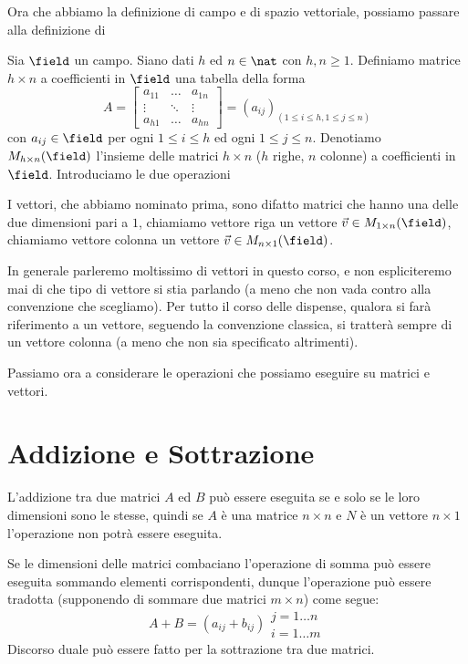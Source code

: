 Ora che abbiamo la definizione di campo e di spazio vettoriale, possiamo passare alla definizione di
\begin{definition} [Matrice]
	Sia $\field$ un campo. Siano dati $h$ ed $n \in \nat$ con $h, n \geq 1$. Definiamo matrice $h \times n$ a coefficienti in $\field$ una tabella della forma
	\begin{equation}
		A =
		\begin{bmatrix}
			a_{11} & \dots  & a_{1n} \\
			\vdots & \ddots & \vdots \\
			a_{h1} & \dots  & a_{hn}
		\end{bmatrix}
		= (a_{ij})_{(1 \leq i \leq h, 1 \leq j \leq n)}
	\end{equation}
	con $a_{ij} \in \field$ per ogni $1 \leq i \leq h$ ed ogni $1 \leq j \leq n$. Denotiamo $M_{h \times n}(\field)$ l'insieme delle matrici $h \times n$ ($h$ righe, $n$ colonne) a coefficienti in $\field$. Introduciamo le due operazioni
\end{definition}
I vettori, che abbiamo nominato prima, sono difatto matrici che hanno una delle due dimensioni pari a $1$, chiamiamo vettore riga un vettore $\vec{v} \in M_{1 \times n}(\field)$, chiamiamo vettore colonna un vettore $\vec{v} \in M_{n \times 1}(\field)$.

In generale parleremo moltissimo di vettori in questo corso, e non espliciteremo mai di che tipo di vettore si stia parlando (a meno che non vada contro alla convenzione che scegliamo). Per tutto il corso delle dispense, qualora si farà riferimento a un vettore, seguendo la convenzione classica, si tratterà sempre di un vettore colonna (a meno che non sia specificato altrimenti).

Passiamo ora a considerare le operazioni che possiamo eseguire su matrici e vettori.
\section{Addizione e Sottrazione}
L'addizione tra due matrici $A$ ed $B$ può essere eseguita se e solo se le loro dimensioni sono le stesse, quindi se $A$ è una matrice $n \times n$ e $N$ è un vettore $n \times 1$ l'operazione non potrà essere eseguita.

Se le dimensioni delle matrici combaciano l'operazione di somma può essere eseguita sommando elementi corrispondenti, dunque l'operazione può essere tradotta (supponendo di sommare due matrici $m \times n$) come segue:
\begin{equation}
	A + B = (a_{ij} + b_{ij})\substack{\scriptstyle j = 1 \dots n \\ \scriptstyle i = 1 \dots m}
\end{equation}
Discorso duale può essere fatto per la sottrazione tra due matrici.
